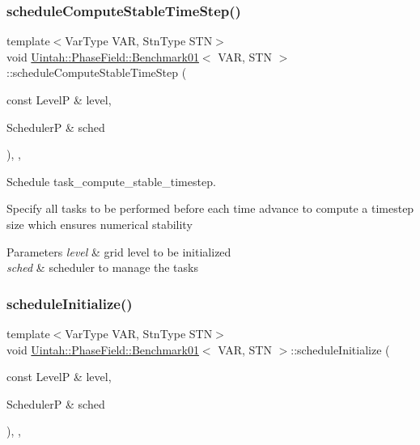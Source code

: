 \subsubsection{\texorpdfstring{schedule\+Compute\+Stable\+Time\+Step()}{scheduleComputeStableTimeStep()}}
{\footnotesize\ttfamily template$<$Var\+Type V\+AR, Stn\+Type S\+TN$>$ \\
void \hyperlink{classUintah_1_1PhaseField_1_1Benchmark01}{Uintah\+::\+Phase\+Field\+::\+Benchmark01}$<$ V\+AR, S\+TN $>$\+::schedule\+Compute\+Stable\+Time\+Step (\begin{DoxyParamCaption}\item[{const LevelP \&}]{level,  }\item[{SchedulerP \&}]{sched }\end{DoxyParamCaption})\hspace{0.3cm}{\ttfamily [override]}, {\ttfamily [protected]}, {\ttfamily [virtual]}}



Schedule task\+\_\+compute\+\_\+stable\+\_\+timestep. 

Specify all tasks to be performed before each time advance to compute a timestep size which ensures numerical stability


\begin{DoxyParams}{Parameters}
{\em level} & grid level to be initialized \\
\hline
{\em sched} & scheduler to manage the tasks \\
\hline
\end{DoxyParams}
\mbox{\label{classUintah_1_1PhaseField_1_1Benchmark01_adaa55a328a231404f070cc9730764852}} 
\subsubsection{\texorpdfstring{schedule\+Initialize()}{scheduleInitialize()}}
{\footnotesize\ttfamily template$<$Var\+Type V\+AR, Stn\+Type S\+TN$>$ \\
void \hyperlink{classUintah_1_1PhaseField_1_1Benchmark01}{Uintah\+::\+Phase\+Field\+::\+Benchmark01}$<$ V\+AR, S\+TN $>$\+::schedule\+Initialize (\begin{DoxyParamCaption}\item[{const LevelP \&}]{level,  }\item[{SchedulerP \&}]{sched }\end{DoxyParamCaption})\hspace{0.3cm}{\ttfamily [override]}, {\ttfamily [protected]}, {\ttfamily [virtual]}}



